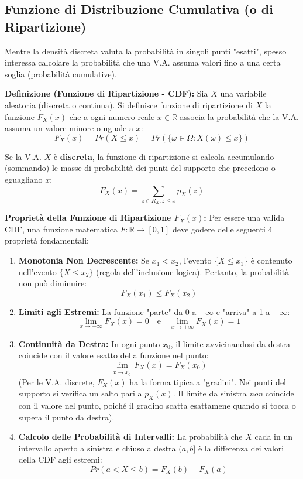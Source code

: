 \documentclass[12pt, a4paper]{article}
\begin{document}
\subsection{Funzione di Distribuzione Cumulativa (o di Ripartizione)}
Mentre la densità discreta valuta la probabilità in singoli punti "esatti", spesso interessa calcolare la probabilità che una V.A. assuma valori fino a una certa soglia (probabilità cumulative).

\textbf{Definizione (Funzione di Ripartizione - CDF):} Sia $X$ una variabile aleatoria (discreta o continua). Si definisce funzione di ripartizione di $X$ la funzione $F_X(x)$ che a ogni numero reale $x \in \mathbb{R}$ associa la probabilità che la V.A. assuma un valore minore o uguale a $x$:
$$ F_X(x) = Pr(X \le x) = Pr(\{\omega \in \Omega : X(\omega) \le x\}) $$

Se la V.A. $X$ è \textbf{discreta}, la funzione di ripartizione si calcola accumulando (sommando) le masse di probabilità dei punti del supporto che precedono o eguagliano $x$:
$$ F_X(x) = \sum_{z \in R_X : z \le x} p_X(z) $$

\textbf{Proprietà della Funzione di Ripartizione $F_X(x)$:}
Per essere una valida CDF, una funzione matematica $F : \mathbb{R} \to [0, 1]$ deve godere delle seguenti 4 proprietà fondamentali:
\begin{enumerate}
    \item \textbf{Monotonia Non Decrescente:} Se $x_1 < x_2$, l'evento $\{X \le x_1\}$ è contenuto nell'evento $\{X \le x_2\}$ (regola dell'inclusione logica). Pertanto, la probabilità non può diminuire:
    $$ F_X(x_1) \le F_X(x_2) $$
    \item \textbf{Limiti agli Estremi:} La funzione "parte" da 0 a $-\infty$ e "arriva" a 1 a $+\infty$:
    $$ \lim_{x \to -\infty} F_X(x) = 0 \quad \text{e} \quad \lim_{x \to +\infty} F_X(x) = 1 $$
    \item \textbf{Continuità da Destra:} In ogni punto $x_0$, il limite avvicinandosi da destra coincide con il valore esatto della funzione nel punto:
    $$ \lim_{x \to x_0^+} F_X(x) = F_X(x_0) $$
    (Per le V.A. discrete, $F_X(x)$ ha la forma tipica a "gradini". Nei punti del supporto si verifica un salto pari a $p_X(x)$. Il limite da sinistra \textit{non} coincide con il valore nel punto, poiché il gradino scatta esattamene quando si tocca o supera il punto da destra).
    \item \textbf{Calcolo delle Probabilità di Intervalli:} La probabilità che $X$ cada in un intervallo aperto a sinistra e chiuso a destra $(a, b]$ è la differenza dei valori della CDF agli estremi:
    $$ Pr(a < X \le b) = F_X(b) - F_X(a) $$
\end{enumerate}
\end{document}
